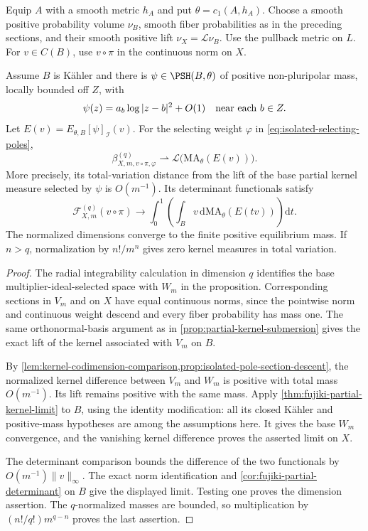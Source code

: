 Equip $A$ with a smooth metric $h_A$ and put $\theta=c_1(A,h_A)$. Choose a smooth positive probability volume $\nu_B$, smooth fiber probabilities as in the preceding sections, and their smooth positive lift $\nu_X=\mathcal L\nu_B$. Use the pullback metric on $L$. For $v\in C(B)$, use $v\circ\pi$ in the continuous norm on $X$.

\begin{theorem}\label{thm:isolated-pole-kernel-limit}
Assume $B$ is K\"ahler and there is $\psi\in\PSH(B,\theta)$ of positive non-pluripolar mass, locally bounded off $Z$, with
\[
 \psi(z)=a_b\log|z-b|^2+O(1)\quad\hbox{near each }b\in Z.
\]
Let $E(v)=E_{\theta,B}[\psi]_{\mathcal I}(v)$. For the selecting weight $\varphi$ in \eqref{eq:isolated-selecting-poles},
\[
 \beta_{X,m,v\circ\pi,\varphi}^{(q)}
      \rightharpoonup\mathcal L\bigl(\mathrm{MA}_\theta(E(v))\bigr).
\]
More precisely, its total-variation distance from the lift of the base partial kernel measure selected by $\psi$ is $O(m^{-1})$. Its determinant functionals satisfy
\[
 \mathcal F_{X,m}^{(q)}(v\circ\pi)\longrightarrow
 \int_0^1\!\left(\int_B
           v\,\mathrm{d}\mathrm{MA}_\theta(E(tv))\right)\mathrm{d}t.
\]
The normalized dimensions converge to the finite positive equilibrium mass. If $n>q$, normalization by $n!/m^n$ gives zero kernel measures in total variation.
\end{theorem}
\begin{proof}
The radial integrability calculation in dimension $q$ identifies the base multiplier-ideal-selected space with $W_m$ in the proposition. Corresponding sections in $V_m$ and on $X$ have equal continuous norms, since the pointwise norm and continuous weight descend and every fiber probability has mass one. The same orthonormal-basis argument as in \cref{prop:partial-kernel-submersion} gives the exact lift of the kernel associated with $V_m$ on $B$.

By \cref{lem:kernel-codimension-comparison,prop:isolated-pole-section-descent}, the normalized kernel difference between $V_m$ and $W_m$ is positive with total mass $O(m^{-1})$. Its lift remains positive with the same mass. Apply \cref{thm:fujiki-partial-kernel-limit} to $B$, using the identity modification: all its closed K\"ahler and positive-mass hypotheses are among the assumptions here. It gives the base $W_m$ convergence, and the vanishing kernel difference proves the asserted limit on $X$.

The determinant comparison bounds the difference of the two functionals by $O(m^{-1})\|v\|_\infty$. The exact norm identification and \cref{cor:fujiki-partial-determinant} on $B$ give the displayed limit. Testing one proves the dimension assertion. The $q$-normalized masses are bounded, so multiplication by $(n!/q!)m^{q-n}$ proves the last assertion.
\end{proof}

